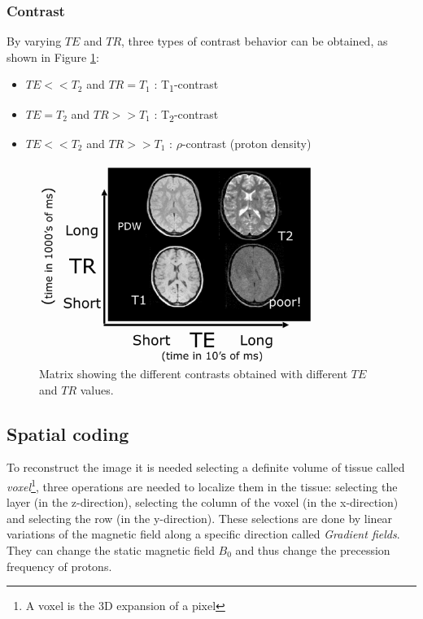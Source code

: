  \subsubsection*{Contrast}
 By varying $TE$ and $TR$, three types of contrast behavior can be obtained, as shown in Figure \ref{fig:matrixTR_TE}:
 \begin{itemize}
    \item $TE<<T_2$ and $TR=T_1$ : T\textsubscript{1}-contrast
    \item $TE=T_2$ and $TR>>T_1$ : T\textsubscript{2}-contrast
    \item $TE<<T_2$ and $TR>>T_1$ : $\rho$-contrast (proton density)
 \end{itemize}

 \begin{figure}[h]
    \centering
    \includegraphics[width=0.8\textwidth]{images/matrix_contrast.png}
    \caption{Matrix showing the different contrasts obtained with different $TE$ and $TR$ values. \cite{matrixContrast}}
    \label{fig:matrixTR_TE}
 \end{figure}

 \subsection{Spatial coding}
 To reconstruct the image it is needed selecting a definite volume of tissue called \emph{voxel}\footnote{A voxel is the 3D expansion of a pixel}, three operations are needed to localize them in the tissue: selecting the layer (in the z-direction), selecting the column of the voxel (in the x-direction) and selecting the row (in the y-direction).
 These selections are done by linear variations of the magnetic field along a specific direction called \emph{Gradient fields}. They can change the static magnetic field $B_0$ and thus change the precession frequency of protons.\\
 

